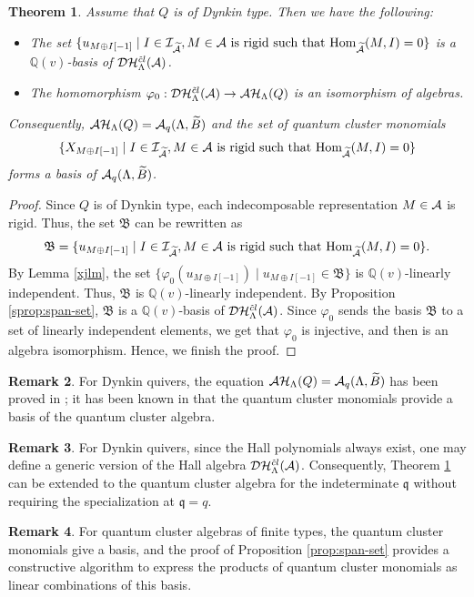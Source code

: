 \documentclass[reqno,12pt]{amsart}
\numberwithin{equation}{section}
\theoremstyle{plain} %
\newtheorem{theorem}{\bf Theorem}[section]
\theoremstyle{definition} %
\newtheorem{remark}[theorem]{\bf Remark}
\begin{document}
\begin{theorem}\label{thm:hall-quantum-dynkin}
Assume that $Q$ is of Dynkin type. Then we have the following:
    \begin{itemize}
        \item[(1)] The set $\{u_{M\oplus I[-1]}\mid I\in \mathcal{I}_{\widetilde{\mathcal{A}}}, M\in{\mathcal{A}}~\text{is rigid such that}~ \mbox{\rm Hom}_{\widetilde{\mathcal{A}}}(M,I)=0 \}$ is a $\mathbb{Q}(v)$-basis of $\mathcal {D}\mathcal {H}_\Lambda^{{\tilde{c}l}}({\mathcal{A}})$.
        \item[(2)]  The homomorphism $\varphi_0:\mathcal {D}\mathcal {H}_\Lambda^{{\tilde{c}l}}({\mathcal{A}})\to \mathcal{A}\mathcal{H}_\Lambda(Q)$ is an isomorphism of algebras.
    \end{itemize}
    Consequently, $\mathcal{A}\mathcal{H}_\Lambda(Q)=\mathcal{A}_q(\Lambda,\widetilde{B})$ and the set of quantum cluster monomials $$\{X_{M\oplus I[-1]}\mid I\in \mathcal{I}_{\widetilde{\mathcal{A}}}, M\in{\mathcal{A}}~\text{is rigid such that}~ \mbox{\rm Hom}_{\widetilde{\mathcal{A}}}(M,I)=0 \}$$ forms a basis of $\mathcal{A}_q(\Lambda,\widetilde{B})$.
\end{theorem}
\begin{proof}
Since $Q$ is of Dynkin type, each indecomposable representation $M\in \mathcal{A}$ is rigid. Thus, the set $\mathfrak{B}$ can be rewritten as
    \[
    \mathfrak{B}=\{u_{M\oplus I[-1]}\mid I\in \mathcal{I}_{\widetilde{\mathcal{A}}}, M\in \mathcal{A}~\text{is rigid such that}~ \mbox{\rm Hom}_{\widetilde{\mathcal{A}}}(M,I)=0 \}.
    \]
    By Lemma \ref{xjlm}, the set $\{\varphi_0(u_{M\oplus I[-1]})\mid u_{M\oplus I[-1]}\in \mathfrak{B}\}$ is $\mathbb{Q}(v)$-linearly independent. Thus, $\mathfrak{B}$ is $\mathbb{Q}(v)$-linearly independent.
    By Proposition \ref{sprop:span-set}, $\mathfrak{B}$ is a $\mathbb{Q}(v)$-basis of $\mathcal {D}\mathcal {H}_\Lambda^{{\tilde{c}l}}({\mathcal{A}})$. Since $\varphi_0$ sends the basis $\mathfrak{B}$ to a set of linearly independent elements, we get that $\varphi_0$ is injective, and then is an algebra isomorphism. Hence, we finish the proof.
\end{proof}
\begin{remark}
For Dynkin quivers, the equation $\mathcal{A}\mathcal{H}_\Lambda(Q)=\mathcal{A}_q(\Lambda,\widetilde{B})$ has been proved in \cite{D}; it has been known in \cite{DX} that the quantum cluster monomials provide a basis of the quantum cluster algebra.
\end{remark}
\begin{remark}
  For Dynkin quivers, since the Hall polynomials always exist, one may define a generic version of the Hall algebra $\mathcal {D}\mathcal {H}_\Lambda^{{\tilde{c}l}}({\mathcal{A}})$. Consequently, Theorem \ref{thm:hall-quantum-dynkin} can be extended to the quantum cluster algebra for the indeterminate $\mathfrak{q}$ without requiring the specialization at $\mathfrak{q}=q$.
\end{remark}
\begin{remark}
   For quantum cluster algebras of finite types, the quantum cluster monomials give a basis, and the proof of Proposition \ref{prop:span-set} provides a constructive algorithm to express the products of quantum cluster monomials as linear combinations of this basis.
\end{remark}
\end{document}
